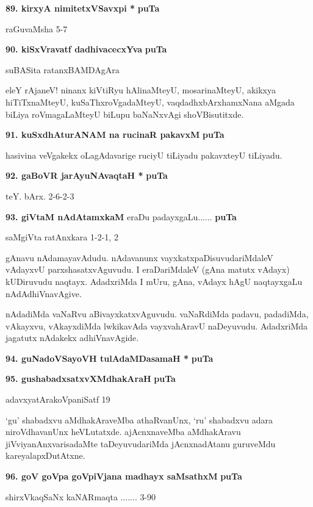 \eject
\noindent
\textbf{89. kirxyA nimitetxVSavxpi *} \hfill{\bf puTa \pageref{56b}}

\hfill{raGuvaMsha 5-7}

\medskip
\noindent
\textbf{90. kiSxVravatf dadhivacecxYva} \hfill{\bf puTa \pageref{207a}}

\hfill{suBASita ratanxBAMDAgAra}

\smallskip
eleY rAjaneV! ninanx kiVtiRyu hAlinaMteyU, mosarinaMteyU, akikxya hiTiTxnaMteyU, kuSaThxroVgadaMteyU, vaqdadhxbArxhamxNana aMgada biLiya roVmagaLaMteyU biLupu baNaNxvAgi shoVBisutitxde.

\medskip
\noindent
\textbf{91. kuSxdhAturANAM na rucinaR pakavxM} \hfill{\bf puTa \pageref{221}}

\smallskip
hasivina veVgakekx oLagAdavarige ruciyU tiLiyadu pakavxteyU tiLiyadu.

\medskip
\noindent
\textbf{92. gaBoVR jarAyuNAvaqtaH *} \hfill{\bf puTa \pageref{87a}}

\hfill{teY. bArx. 2-6-2-3}

\medskip
\noindent
\textbf{93. giVtaM nAdAtamxkaM }eraDu padayxgaLu...... \hfill{\bf puTa \pageref{159a}}

\hfill{saMgiVta ratAnxkara 1-2-1, 2}

\smallskip
gAnavu nAdamayavAdudu. nAdavanunx vayxkatxpaDisuvudariMdaleV vAdayxvU parxshasatxvAguvudu. I eraDariMdaleV (gAna matutx vAdayx) kUDiruvudu naqtayx. AdadxriMda I mUru, gAna, vAdayx hAgU naqtayxgaLu nAdAdhiVnavAgive.

nAdadiMda vaNaRvu aBivayxkatxvAguvudu. vaNaRdiMda padavu, padadiMda, vAkayxvu, vAkayxdiMda lwkikavAda vayxvahAravU naDeyuvudu. AdadxriMda jagatutx nAdakekx adhiVnavAgide.


\medskip
\noindent
\textbf{94. guNadoVSayoVH tulAdaMDasamaH *} \hfill{\bf puTa \pageref{94d}}

\medskip
\noindent
\textbf{95. gushabadxsatxvXMdhakAraH} \hfill{\bf puTa \pageref{190}}

\hfill{adavxyatArakoVpaniSatf 19}

\smallskip
`gu' shabadxvu aMdhakAraveMba athaRvanUnx, `ru' shabadxvu adara niroVdhavanUnx heVLutatxde. ajAcnxnaveMba aMdhakAravu jiVviyanAnxvarisadaMte taDeyuvudariMda jAcnxnadAtanu guruveMdu kareyalapxDutAtxne.

\medskip
\noindent
\textbf{96. goV goVpa goVpiVjana madhayx saMsathxM} \hfill{\bf puTa \pageref{229a}}

\hfill{shirxVkaqSaNx kaNARmaqta ....... 3-90}

